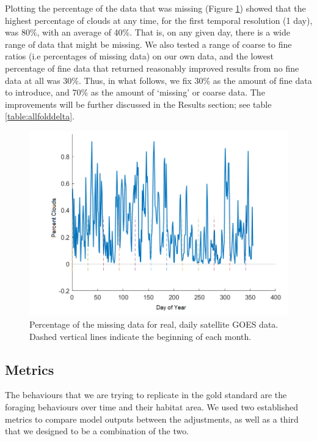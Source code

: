 \documentclass[11pt]{article}
\begin{document}
Plotting the percentage of the data that was missing (Figure \ref{fig:goesclouds}) showed that the highest percentage of clouds at any time, for the first temporal resolution (1 day), was 80\%, with an average of 40\%. That is, on any given day, there is a wide range of data that might be missing. We also tested a range of coarse to fine ratios (i.e percentages of missing data) on our own data, and the lowest percentage of fine data that returned reasonably improved results from no fine data at all was 30\%. Thus, in what follows, we fix 30\% as the amount of fine data to introduce, and 70\% as the amount of `missing' or coarse data. The improvements will be further discussed in the Results section; see table \ref{table:allfolddelta}.  \par 

\begin{figure}[ht] \centering
    \includegraphics[width=6in]{goes_1d_cloudpercent.png}
    \caption{Percentage of the missing data for real, daily satellite GOES data. Dashed vertical lines indicate the beginning of each month.}
    \label{fig:goesclouds}
\end{figure}

\subsection{Metrics}
The behaviours that we are trying to replicate in the gold standard are the foraging behaviours over time and their habitat area. We used two established metrics to compare model outputs between the adjustments, as well as a third that we designed to be a combination of the two.\par
\end{document}
